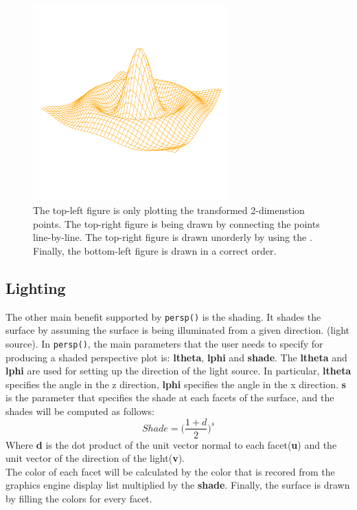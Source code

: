 \documentclass[paper=a4, fontsize=11pt]{report}
\begin{document}
\begin{figure}[h]
\begin{center}
		\includegraphics[height = 7.5cm, width = 7.5cm]{figure/standalone_p_4.pdf}
		\caption{The top-left figure is only plotting the transformed 2-dimenstion points. The top-right figure is being drawn by connecting the points line-by-line. The top-right figure is drawn unorderly by using the . Finally, the bottom-left figure is drawn in a correct order.}
		\label{figure_3.2}
	\end{center}
\end{figure}

\subsection{Lighting}
The other main benefit supported by \texttt{persp()} is the shading. It shades the surface by assuming the surface is being illuminated from a given direction. (light source). In \texttt{persp()}, the main parameters that the user needs to specify for producing a shaded perspective plot is: \textbf{ltheta}, \textbf{lphi} and \textbf{shade}. The \textbf{ltheta} and \textbf{lphi} are used for setting up the direction of the light source. In particular, \textbf{ltheta} specifies the angle in the z direction, \textbf{lphi} specifies the angle in the x direction. \textbf{s} is the parameter that specifies the shade at each facets of the surface, and the shades will be computed as follows:
\begin{equation}
Shade = \big(\frac{1 + d}{2}\big)^{s}
\end{equation}
Where \textbf{d} is the dot product of the unit vector normal to each facet(\textbf{u}) and the unit vector of the direction of the light(\textbf{v}). \\

The color of each facet will be calculated by the color that is recored from the graphics engine display list multiplied by the \textbf{shade}. Finally, the surface is drawn by filling the colors for every facet.\\
\end{document}
